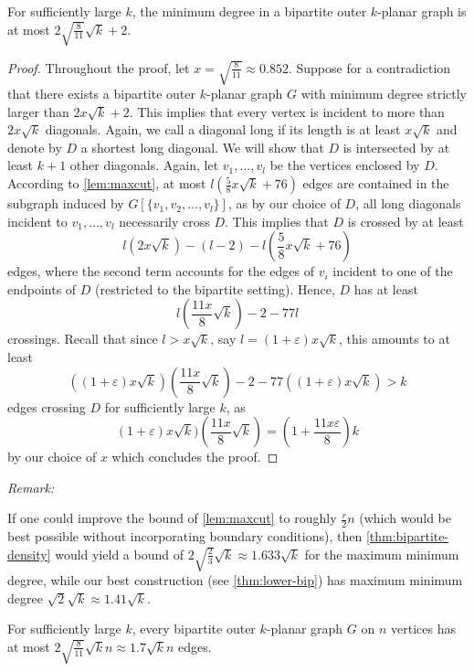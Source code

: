 \documentclass[nolineno,a4paper,USenglish,cleveref,autoref,thm-restate]
{socg}
\begin{document}
\begin{theorem}\label{thm:bipartite-density}
For sufficiently large $k$, the minimum degree in a bipartite outer $k$-planar graph is at most $2\sqrt{\frac{8}{11}}\sqrt{k}+2$.
\end{theorem}
\begin{proof}
Throughout the proof, let $x = \sqrt{\frac{8}{11}}\approx 0.852$. Suppose for a contradiction that there exists a bipartite outer $k$-planar graph $G$ with minimum degree strictly larger than $2x\sqrt{k}+2$. This implies that every vertex is incident to more than $2x\sqrt{k}$ diagonals.
Again, we call a diagonal long if its length is at least $x\sqrt{k}$ and denote by $D$ a shortest long diagonal. We will show that $D$ is intersected by at least $k+1$ other diagonals.
Again, let $v_1,\dots,v_l$ be the vertices enclosed by $D$.
According to \cref{lem:maxcut}, at most $l(\frac{5}{8}x\sqrt{k}+76)$ edges are contained in the subgraph induced by $G[\{v_1,v_2,\dots,v_l\}]$, as by our choice of $D$, all long diagonals incident to $v_1,\dots,v_l$ necessarily cross $D$. This implies that $D$ is crossed by at least
\[
l(2x\sqrt{k})- (l-2) - l(\frac{5}{8}x\sqrt{k}+76)
\]
edges, where the second term accounts for the edges of $v_i$ incident to one of the endpoints of $D$ (restricted to the bipartite setting).
Hence, $D$ has at least
\[l(\frac{11x}{8}\sqrt{k}) -2-77l\]
crossings.
Recall that since  $l > x\sqrt{k}$, say $l = (1+\varepsilon)x\sqrt{k}$, this amounts to at least
\[((1+\varepsilon)x\sqrt{k})(\frac{11x}{8}\sqrt{k}) -2 -77((1+\varepsilon)x\sqrt{k}) > k\] edges crossing $D$ for sufficiently large $k$, as 
\[(1+\varepsilon)x\sqrt{k})(\frac{11x}{8}\sqrt{k}) = (1+\frac{11x\varepsilon}{8}) k \]
by our choice of $x$ which concludes the proof.
\end{proof}
\textit{Remark:} 

If one could improve the bound of \cref{lem:maxcut} to roughly $\frac{r}{2}n$ (which would be best possible without incorporating boundary conditions), then \cref{thm:bipartite-density} would yield a bound of $2 \sqrt{\frac{2}{3}}\sqrt{k} \approx 1.633\sqrt{k}$ for the maximum minimum degree, while our best construction (see \cref{thm:lower-bip}) has maximum minimum degree $\sqrt{2}\sqrt{k} \approx 1.41\sqrt{k}$.
\begin{corollary}\label{thm:edge-density-third-bipartite}
For sufficiently large $k$, every bipartite outer $k$-planar graph $G$ on $n$ vertices has at most $2\sqrt{\frac{8}{11}}\sqrt{k}n \approx 1.7\sqrt{k}n$ edges.
\end{corollary}
\end{document}

